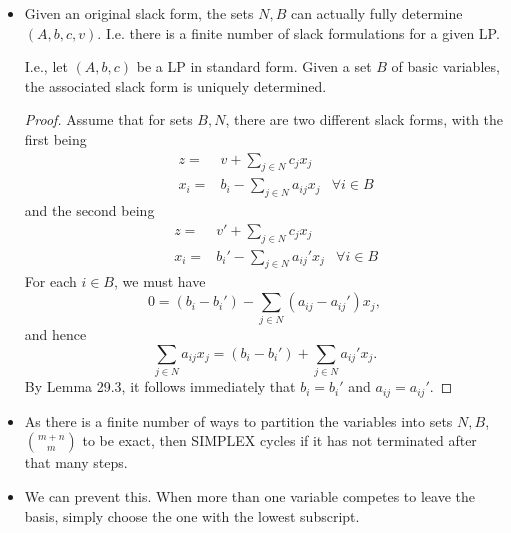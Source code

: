 \begin{itemize}
\begin{proof}
    The first part of the invariant is true, since pivoting doesn't
    change any constraints, but uses basic algebraic rules for
    changing their formulation into an equivalent, alternative
    form. The solution space for a pivoted slack form is therefore
    equal to the original form, and hence they are equivalent.

    Due to the restrictions on what variables we pick to enter and
    leave the basis, respectively, any pivoted $\hat{b_i}$ for $i \in
    B - \{l\} \cup \{e\}$ is non-negative.

    Using the above, we can easily conclude that the basic solution is
    feasible.

    If the algorithm terminates by returning a solution, the loop
    invariant ensures that it is feasible. If it returns
    ``unbounded'', then it means that there is a non-basic variable
    with positive coefficient which has no upper bound. Hence, we can
    make the objective value arbitrarily big, and the LP is therefore
    unbounded.
  \end{proof}

\item Given an original slack form, the sets $N,B$ can actually fully
  determine $(A,b,c,v)$. I.e. there is a finite number of slack
  formulations for a given LP.

  I.e., let $(A,b,c)$ be a LP in standard form. Given a set $B$ of
  basic variables, the associated slack form is uniquely determined.
  \begin{proof}
    Assume that for sets $B,N$, there are two different slack forms,
    with the first being
    \begin{align*}
      && z ={}& v + \sum_{j\in N} c_j x_j \\
      && x_i ={}& b_i - \sum_{j\in N} a_{ij} x_j & \forall i \in B
    \end{align*}
    and the second being
    \begin{align*}
      && z ={}& v' + \sum_{j\in N} c_j x_j \\
      && x_i ={}& b_i' - \sum_{j\in N} a_{ij}' x_j & \forall i \in B
    \end{align*}
    For each $i \in B$, we must have
    $$
      0 = (b_i - b_i') - \sum_{j \in N} (a_{ij} - a_{ij}') x_j,
    $$
    and hence
    $$
      \sum_{j \in N} a_{ij} x_j = (b_i - b_i') + \sum_{j \in N} a_{ij}'x_j.
    $$
    By Lemma 29.3, it follows immediately that $b_i = b_i'$ and
    $a_{ij} = a_{ij}'$.
  \end{proof}

\item As there is a finite number of ways to partition the variables
  into sets $N,B$, $\binom{m+n}{m}$ to be exact, then SIMPLEX cycles
  if it has not terminated after that many steps.

\item We can prevent this. When more than one variable competes to
  leave the basis, simply choose the one with the lowest subscript.
\end{itemize}

